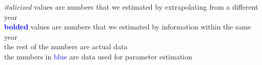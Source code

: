 \documentclass[12pt]{article}
\begin{document}
\begin{sidewaystable}
\textit{italicized} values are numbers that we estimated by extrapolating from a different year \\
 \textbf{\textcolor{blue}{bolded}} values are numbers that we estimated by information within the same year \\
 the rest of the numbers are actual data \\
 the numbers in \textcolor{blue}{blue} are data used for parameter estimation
\label{tab:template}
\end{sidewaystable} 

 
\pagebreak
\end{document}
